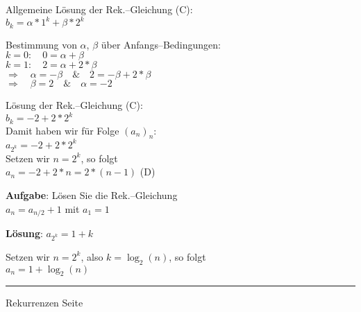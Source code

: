 
\begin{slide}{}
\normalsize

\begin{center}
\end{center}
\vspace*{0.5cm}

\footnotesize
Allgemeine L\"osung der Rek.--Gleichung (C): \\[0.3cm]
\hspace*{1.3cm} $b_k = \alpha * 1^k + \beta * 2^k$ 

Bestimmung von $\alpha$, $\beta$ \"uber Anfangs--Bedingungen: \\[0.3cm]
\hspace*{1.3cm} $k = 0: \quad 0 = \alpha + \beta$ \\[0.3cm]
\hspace*{1.3cm} $k = 1: \quad 2 = \alpha + 2 * \beta$ \\[0.3cm]
\hspace*{1.3cm} $\Rightarrow \quad \alpha = - \beta \quad \& \quad 2 = - \beta + 2 * \beta$ \\[0.3cm]
\hspace*{1.3cm} $\Rightarrow \quad \beta = 2 \quad \& \quad \alpha = -2$

L\"osung der Rek.--Gleichung (C): \\[0.3cm]
\hspace*{1.3cm} $b_k = -2 + 2 * 2^k$ \\[0.3cm]
Damit haben wir f\"ur Folge $(a_n)_n$:\\[0.3cm]
\hspace*{1.3cm} $a_{2^k} = - 2 + 2 * 2^k$ \\[0.3cm]
Setzen wir $n = 2^k$, so folgt \\[0.3cm]
\hspace*{1.3cm} $a_n = -2 + 2 * n = 2 * (n - 1)$ \hspace*{\fill} (D)

\textbf{Aufgabe}: L\"osen Sie die Rek.--Gleichung \\[0.3cm]
\hspace*{1.3cm} $a_n = a_{n/2} + 1$ \quad mit $a_1 = 1$

\textbf{L\"osung}: $a_{2^k} = 1 + k$ 

Setzen wir $n = 2^k$, also $k = \log_2(n)$, so folgt \\[0.3cm]
\hspace*{1.3cm} $a_n = 1 + \log_2(n)$


\vspace*{\fill}
\tiny \addtocounter{mypage}{1}
\rule{17cm}{1mm}
Rekurrenzen  \hspace*{\fill} Seite 
\end{slide}

